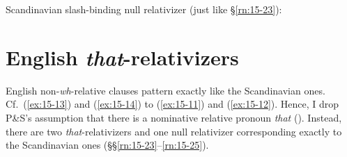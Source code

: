 \documentclass[output=paper]{LSP/langsci}
\begin{document}
\pagebreak
\randnum\label{rn:15-25}Scandinavian slash-binding null relativizer (just like §\ref{rn:15-23}):
\begin{exe}
\ex
\end{exe}

\section{English \textit{that}-relativizers}

\randnum\label{rn:15-26}English non-\emph{wh}-relative clauses pattern exactly like the Scandinavian
ones. Cf.\  (\ref{ex:15-13}) and (\ref{ex:15-14}) to (\ref{ex:15-11}) and (\ref{ex:15-12}). Hence, I drop P\&S's
assumption that there is a nominative relative pronoun \textit{that} (\citeyear[220 (33)]{PollardSag1994}). Instead, there are two \textit{that}-relativizers and one null
relativizer corresponding exactly to the Scandinavian ones
(§§\ref{rn:15-23}--\ref{rn:15-25}).
\end{document}
